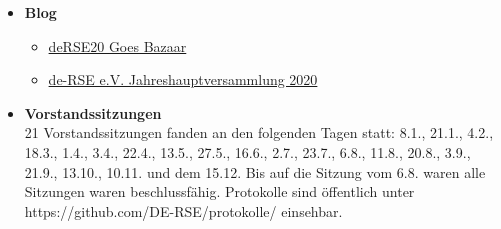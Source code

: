 \begin{itemize}
 \item \textbf{Blog}
 \begin{itemize}
  \item \href{https://de-rse.org/blog/2020/01/31/derse20-goes-bazaar.html}{deRSE20 Goes Bazaar}
  \item \href{https://de-rse.org/blog/2020/09/22/deRSE-MV.html}{de-RSE e.V. Jahreshauptversammlung 2020}
 \end{itemize}
 \item \textbf{Vorstandssitzungen}\\
  21 Vorstandssitzungen fanden an den folgenden Tagen statt: 8.1., 21.1., 4.2., 18.3., 1.4., 3.4., 22.4., 13.5., 27.5., 16.6., 2.7., 23.7., 6.8., 11.8., 20.8., 3.9., 21.9., 13.10., 10.11. und dem 15.12.
  Bis auf die Sitzung vom 6.8. waren alle Sitzungen waren beschlussfähig.
  Protokolle sind öffentlich unter https://github.com/DE-RSE/protokolle/ einsehbar.
\end{itemize}




